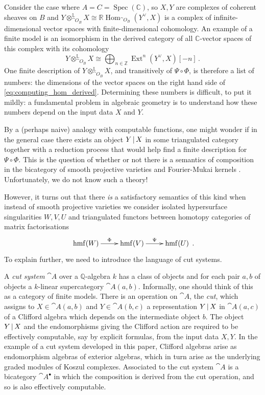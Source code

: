 \documentclass[english,letter paper,12pt,leqno]{article}
\theoremstyle{example}
\numberwithin{equation}{section}
\DeclareMathOperator{\Ext}{Ext}
\DeclareMathOperator{\hmf}{hmf}
\begin{document}
Consider the case where $A = C = \operatorname{Spec}(\mathbb{C})$, so $X,Y$ are complexes of coherent sheaves on $B$ and $Y \otimes^{\mathbb{L}}_{\cat{O}_B} X \cong \mathbb{R}\! \operatorname{Hom}_{\cat{O}_B}(Y^{\vee}, X)$ is a complex of infinite-dimensional vector spaces with finite-dimensional cohomology. An example of a finite model is an isomorphism in the derived category of all $\mathbb{C}$-vector spaces of this complex with its cohomology
\begin{equation}\label{eq:computing_hom_derived}
Y \otimes^{\mathbb{L}}_{\cat{O}_B} X \cong \bigoplus_{n \in \mathbb{Z}} \Ext^n(Y^{\vee},X)[-n]\,.
\end{equation}
One finite description of $Y \otimes^{\mathbb{L}}_{\cat{O}_B} X$, and transitively of $\Psi \circ \Phi$, is therefore a list of numbers: the dimensions of the vector spaces on the right hand side of \eqref{eq:computing_hom_derived}. Determining these numbers is difficult, to put it mildly: a fundamental problem in algebraic geometry is to understand how these numbers depend on the input data $X$ and $Y$.

By a (perhaps naive) analogy with computable functions, one might wonder if in the general case there exists an object $Y \,|\, X$ in some triangulated category together with a reduction process that would help find a finite description for $\Psi \circ \Phi$. This is the question of whether or not there is a semantics of composition in the bicategory of smooth projective varieties and Fourier-Mukai kernels \cite{ct1007.2679}. Unfortunately, we do not know such a theory!

However, it turns out that there \emph{is} a satisfactory semantics of this kind when instead of smooth projective varieties we consider isolated hypersurface singularities $W,V,U$ and triangulated functors between homotopy categories of matrix factorisations \cite{yoshino98}
\begin{equation}\label{eq:pair_functors_hmf}
\xymatrix{
\hmf(W) \ar[r]^-{\Phi} & \hmf(V) \ar[r]^-{\Psi} & \hmf(U)
}\,.
\end{equation}
To explain further, we need to introduce the language of cut systems.

\medskip

A \emph{cut system} $\cat{A}$ over a $\mathbb{Q}$-algebra $k$ has a class of objects and for each pair $a,b$ of objects a $k$-linear supercategory $\cat{A}(a,b)$. Informally, one should think of this as a category of finite models. There is an operation on $\cat{A}$, the \emph{cut}, which assigns to $X \in \cat{A}(a,b)$ and $Y \in \cat{A}(b,c)$ a representation $Y \,|\, X$ in $\cat{A}(a,c)$ of a Clifford algebra which depends on the intermediate object $b$. The object $Y \,|\, X$ and the endomorphisms giving the Clifford action are required to be effectively computable, say by explicit formulas, from the input data $X,Y$. In the example of a cut system developed in this paper, Clifford algebras arise as endomorphism algebras of exterior algebras, which in turn arise as the underlying graded modules of Koszul complexes. Associated to the cut system $\cat{A}$ is a bicategory $\cat{A}^\bullet$ in which the composition is derived from the cut operation, and so is also effectively computable.
\end{document}
